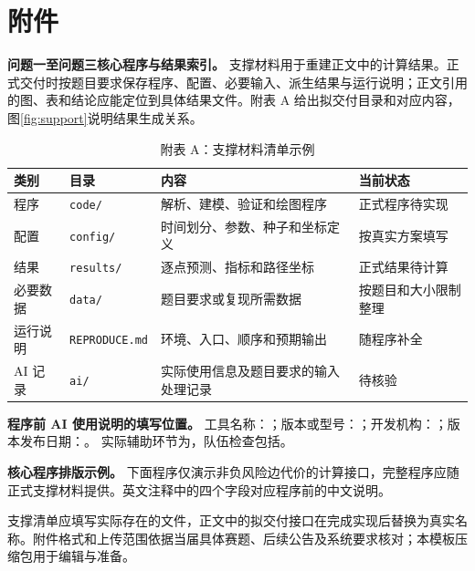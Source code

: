 \clearpage
\section*{附件}
\textbf{问题一至问题三核心程序与结果索引。}
支撑材料用于重建正文中的计算结果。正式交付时按题目要求保存程序、配置、必要输入、派生结果与运行说明；正文引用的图、表和结论应能定位到具体结果文件。附表 A 给出拟交付目录和对应内容，图\ref{fig:support}说明结果生成关系。
\begin{table}[H]\centering\caption*{附表 A：支撑材料清单示例}\label{tab:support}
\begin{tabularx}{\linewidth}{lYYY}\toprule
类别 & 目录 & 内容 & 当前状态\\\midrule
程序 & \texttt{code/} & 解析、建模、验证和绘图程序 & 正式程序待实现\\
配置 & \texttt{config/} & 时间划分、参数、种子和坐标定义 & 按真实方案填写\\
结果 & \texttt{results/} & 逐点预测、指标和路径坐标 & 正式结果待计算\\
必要数据 & \texttt{data/} & 题目要求或复现所需数据 & 按题目和大小限制整理\\
运行说明 & \texttt{REPRODUCE.md} & 环境、入口、顺序和预期输出 & 随程序补全\\
AI 记录 & \texttt{ai/} & 实际使用信息及题目要求的输入处理记录 & 待核验\\\bottomrule
\end{tabularx}\end{table}
\textbf{程序前 AI 使用说明的填写位置。}
工具名称：\aitool；版本或型号：\aimodel；开发机构：\aideveloper；版本发布日期：\aireleased。
实际辅助环节为，队伍检查包括。

\textbf{核心程序排版示例。}
下面程序仅演示非负风险边代价的计算接口，完整程序应随正式支撑材料提供。英文注释中的四个字段对应程序前的中文说明。

支撑清单应填写实际存在的文件，正文中的拟交付接口在完成实现后替换为真实名称。附件格式和上传范围依据当届具体赛题、后续公告及系统要求核对；本模板压缩包用于编辑与准备。

